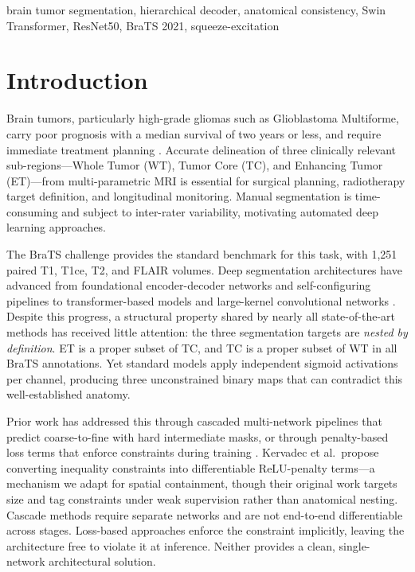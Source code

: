 \documentclass[conference]{IEEEtran}
\begin{document}
\begin{IEEEkeywords}
brain tumor segmentation, hierarchical decoder, anatomical consistency,
Swin Transformer, ResNet50, BraTS 2021, squeeze-excitation
\end{IEEEkeywords}

\section{Introduction}

Brain tumors, particularly high-grade gliomas such as Glioblastoma
Multiforme, carry poor prognosis with a median survival of two years or
less, and require immediate treatment planning \cite{menze_brats}.
Accurate delineation of three clinically relevant
sub-regions---Whole Tumor (WT), Tumor Core (TC), and Enhancing Tumor
(ET)---from multi-parametric MRI is essential for surgical planning,
radiotherapy target definition, and longitudinal monitoring. Manual
segmentation is time-consuming and subject to inter-rater variability,
motivating automated deep learning approaches.

The BraTS challenge \cite{brats2021} provides the standard benchmark
for this task, with 1,251 paired T1, T1ce, T2, and FLAIR volumes.
Deep segmentation architectures have advanced from foundational
encoder-decoder networks \cite{ronneberger_unet, cciccek_3dunet} and
self-configuring pipelines \cite{isensee_3dunet} to transformer-based
models \cite{transbts, unetr, swinunetr} and large-kernel convolutional
networks \cite{mednext}. Despite this progress, a structural property
shared by nearly all state-of-the-art methods has received little
attention: the three segmentation targets are \textit{nested by
definition}. ET is a proper subset of TC, and TC is a proper subset
of WT in all BraTS annotations. Yet standard models apply independent
sigmoid activations per channel, producing three unconstrained binary
maps that can contradict this well-established anatomy.

Prior work has addressed this through cascaded multi-network pipelines
\cite{cascade_brain} that predict coarse-to-fine with hard intermediate
masks, or through penalty-based loss terms that enforce constraints
during training \cite{kervadec_constrained}. Kervadec et al.\ propose
converting inequality constraints into differentiable ReLU-penalty
terms---a mechanism we adapt for spatial containment, though their
original work targets size and tag constraints under weak supervision
rather than anatomical nesting. Cascade methods require separate networks
and are not end-to-end differentiable across stages. Loss-based
approaches enforce the constraint implicitly, leaving the architecture
free to violate it at inference. Neither provides a clean, single-network
architectural solution.
\end{document}
